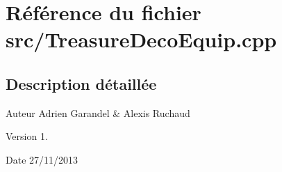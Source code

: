 \section{Référence du fichier src/\-Treasure\-Deco\-Equip.cpp}
\label{_treasure_deco_equip_8cpp}


\subsection{Description détaillée}
\begin{DoxyAuthor}{Auteur}
Adrien Garandel \& Alexis Ruchaud 
\end{DoxyAuthor}
\begin{DoxyVersion}{Version}
1. 
\end{DoxyVersion}
\begin{DoxyDate}{Date}
27/11/2013 
\end{DoxyDate}
